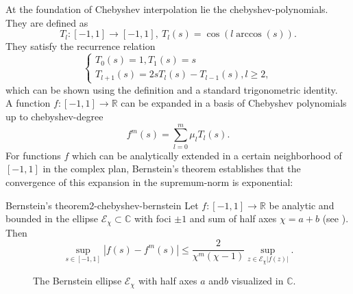 At the foundation of Chebyshev interpolation lie the \glspl{chebyshev-polynomial}.
They are defined as \cite[chapter~3]{trefethen2019chebyshev}
\begin{equation}
    T_l: [-1, 1] \to [-1, 1],~T_l(s) = \cos(l \arccos(s)).
    \label{equ:2-chebyshev-chebyshev-definition}
\end{equation}
They satisfy the recurrence relation
\begin{equation}
    \begin{cases}
        T_0(s) = 1, T_1(s) = s \\ T_{l+1}(s) = 2s T_l(s) - T_{l-1}(s), l \geq 2,
    \end{cases}
    \label{equ:2-chebyshev-chebyshev-recursion}
\end{equation}
which can be shown using the definition 
and a standard trigonometric identity.\\

A function $f:[-1, 1] \to \mathbb{R}$ can be expanded in a basis of Chebyshev
polynomials up to \gls{chebyshev-degree} \cite[chapter~3]{trefethen2019chebyshev}
\begin{equation}
    f^m(s) = \sum_{l=0}^m \mu_l T_l(s).
    \label{equ:2-chebyshev-chebyshev-expansion-general}
\end{equation}
For functions $f$ which can be analytically extended in a certain neighborhood
of $[-1, 1]$ in the complex plan, Bernstein's theorem \cite[theorem~73]{meinardus1967approximation}
establishes that the convergence of this expansion in the supremum-norm is
exponential: 
\begin{theorem}{Bernstein's theorem}{2-chebyshev-bernstein}
    Let $f:[-1, 1] \to \mathbb{R}$ be analytic and bounded in the ellipse $\mathcal{E}_{\chi} \subset \mathbb{C}$
    with foci $\pm 1$ and sum of half axes $\chi = a + b$ (see ).
    Then
    \begin{equation}
        \sup_{s \in [-1, 1]} |f(s) - f^m(s)| \leq \frac{2}{\chi^m(\chi-1)} \sup_{z \in \mathcal{E}_{\chi} |f(z)|}.
        \label{equ:2-chebyshev-bernstein-convergence-result}
    \end{equation}
\end{theorem}

\begin{figure}[ht]
    \centering
    
    \caption{The Bernstein ellipse $\mathcal{E}_{\chi}$ with half axes $a$ and$b$ visualized in $\mathbb{C}$.}
    \label{fig:2-chebyshev-proof-bernstein-ellipse}
\end{figure}

